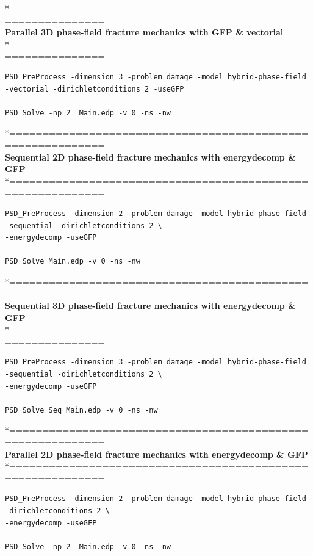 *============================================================\\
\textbf{ Parallel 3D phase-field fracture mechanics with GFP \& vectorial }\\
*============================================================\\
\begin{lstlisting}[style=BashInputStyle]
PSD_PreProcess -dimension 3 -problem damage -model hybrid-phase-field -vectorial -dirichletconditions 2 -useGFP   

PSD_Solve -np 2  Main.edp -v 0 -ns -nw   
\end{lstlisting}
*============================================================\\
 \textbf{Sequential 2D phase-field fracture mechanics with energydecomp \& GFP} \\
*============================================================\\
\begin{lstlisting}[style=BashInputStyle]
PSD_PreProcess -dimension 2 -problem damage -model hybrid-phase-field -sequential -dirichletconditions 2 \
-energydecomp -useGFP   

PSD_Solve Main.edp -v 0 -ns -nw   
\end{lstlisting}
*============================================================\\
\textbf{ Sequential 3D phase-field fracture mechanics with energydecomp \& GFP} \\
*============================================================\\
\begin{lstlisting}[style=BashInputStyle]
PSD_PreProcess -dimension 3 -problem damage -model hybrid-phase-field -sequential -dirichletconditions 2 \
-energydecomp -useGFP   

PSD_Solve_Seq Main.edp -v 0 -ns -nw   
\end{lstlisting}
*============================================================\\
 \textbf{Parallel 2D phase-field fracture mechanics with energydecomp \& GFP} \\
*============================================================\\
\begin{lstlisting}[style=BashInputStyle]
PSD_PreProcess -dimension 2 -problem damage -model hybrid-phase-field -dirichletconditions 2 \
-energydecomp -useGFP  

PSD_Solve -np 2  Main.edp -v 0 -ns -nw   
\end{lstlisting}
